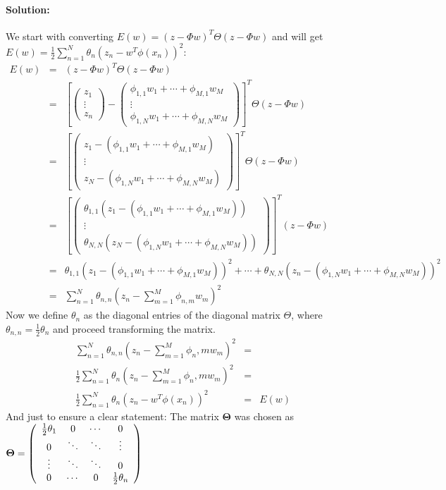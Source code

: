 \documentclass{article}
\newcommand{\Mtx}[1]{\ensuremath{\mathbf{#1}}}
\begin{document}
\begin{enumerate}
\paragraph*{Solution:}
We start with converting $E(w) = (z - \Phi w)^T \Theta (z - \Phi w)$ and will get $E(w) = \frac{1}{2} \sum_{n=1}^{N} \theta_n (z_n - w^T \phi(x_n))^2$:
\begin{eqnarray}
E(w) &=& (z-\Phi w)^T \Theta (z-\Phi w) \\
%
&=& \left[\left(  
\begin{array}{c} 
z_1 \\
\vdots \\
 z_n
\end{array}\right) - \left( 
\begin{array}{c} 
\phi_{1,1}w_1+\cdots +\phi_{M,1}w_M \\
\vdots \\
\phi_{1,N}w_1+\cdots + \phi_{M,N}w_M
\end{array}\right)\right]^T \Theta (z-\Phi w) \\
%
&=& \left[\left( 
\begin{array}{c} 
z_1 - (\phi_{1,1}w_1+\cdots +\phi_{M,1}w_M) \\
\vdots \\
z_N - (\phi_{1,N}w_1+\cdots + \phi_{M,N}w_M)
\end{array}\right)\right]^T \Theta (z-\Phi w) \\
%
&=& \left[\left( 
\begin{array}{c} 
\theta_{1,1}(z_1 - (\phi_{1,1}w_1+\cdots +\phi_{M,1}w_M)) \\
\vdots \\
\theta_{N,N}(z_N - (\phi_{1,N}w_1+\cdots + \phi_{M,N}w_M))
\end{array}\right)\right]^T (z-\Phi w) \\
%
&=& \theta_{1,1} (z_1 - (\phi_{1,1} w_1 + \cdots + \phi_{M,1} w_M))^2 + \cdots + \theta_{N,N} (z_n - (\phi_{1,N} w_1 + \cdots + \phi_{M,N} w_M))^2 \\
%
&=& \sum_{n=1}^N \theta_{n,n} (z_n - \sum_{m=1}^M \phi_{n,m} w_m)^2
\end{eqnarray}
Now we define $\theta_n$ as the diagonal entries of the diagonal matrix $\Theta$, where $\theta_{n,n} = \frac{1}{2} \theta_n$ and proceed transforming the matrix.
\begin{eqnarray}
\sum_{n=1}^N \theta_{n,n} (z_n - \sum_{m=1}^M \phi_n,m w_m)^2 &=&\\
%
\frac{1}{2} \sum_{n=1}^N \theta_{n} (z_n - \sum_{m=1}^M \phi_n,m w_m)^2 &=&\\
%
\frac{1}{2} \sum_{n=1}^N \theta_{n} (z_n - w^T \phi (x_n))^2 &=& E(w)
\end{eqnarray}
And just to ensure a clear statement: The matrix $\Mtx{\Theta} $ was chosen as $\Mtx{\Theta} = \left( 
\begin{array}{c c c c}  
\frac{1}{2}\theta_1 	& 0 					& \cdots 					& 0 \\
0 								& \ddots			& \ddots 					& \vdots \\
\vdots						& 	\ddots			& 	\ddots					&	0		\\
0								& \cdots			&	0							&\frac{1}{2}\theta_n
\end{array} \right)$  



\end{enumerate}
\end{document}
